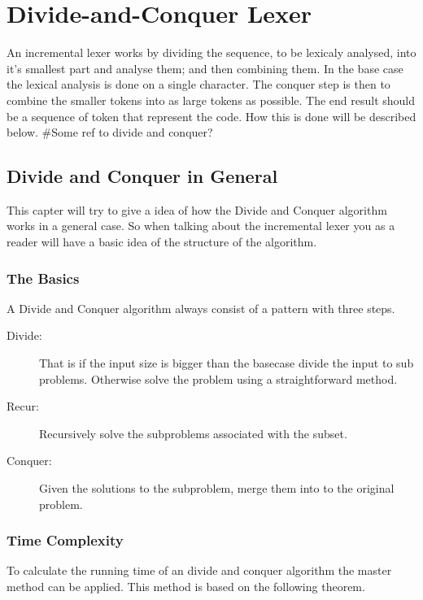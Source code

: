 \chapter{Divide-and-Conquer Lexer}
An incremental lexer works by dividing the sequence, to be lexicaly analysed,
into it's smallest part and analyse them; and then combining them. In the base
case the lexical analysis is done on a single character. The conquer step is
then to combine the smaller tokens into as large tokens as possible. The end
result should be a sequence of token that represent the code. How this is done
will be described below. \#Some ref to divide and conquer?

\section{Divide and Conquer in General}
This capter will try to give a idea of how the Divide and Conquer algorithm works in a general case. So when talking about the incremental lexer you as a reader will have a basic idea of the structure of the algorithm.
\subsection{The Basics}
A Divide and Conquer algorithm always consist of a pattern with three steps. \cite{Goodrich}
\begin{description}
\item[Divide:] That is if the input size is bigger than the basecase divide the input to sub problems. Otherwise solve the problem using a straightforward method.
\item[Recur:] Recursively solve the subproblems associated with the subset.
\item[Conquer:] Given the solutions to the subproblem, merge them into to the original problem.
\end{description}

\subsection{Time Complexity}
To calculate the running time of an divide and conquer algorithm the master method can be applied. \cite{Cormen} This method is based on the following theorem.


